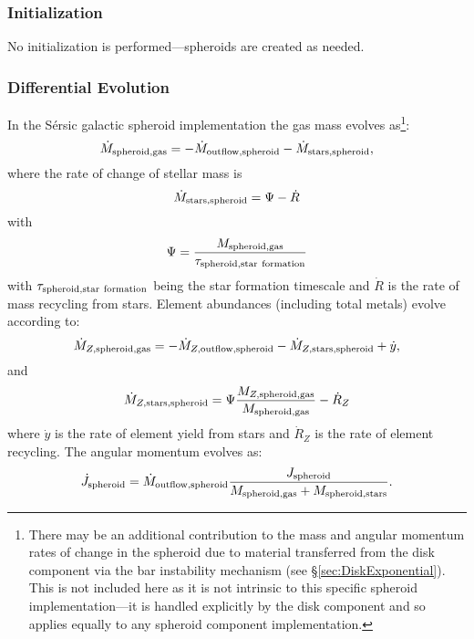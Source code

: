 \subsubsection{Initialization}

No initialization is performed---spheroids are created as needed.

\subsubsection{Differential Evolution}

In the S\'ersic galactic spheroid implementation the gas mass evolves as\footnote{There may be an additional contribution to the mass and angular momentum rates of change in the spheroid due to material transferred from the disk \gls{component} via the bar instability mechanism (see \S\protect\ref{sec:DiskExponential}). This is not included here as it is not intrinsic to this specific spheroid implementation---it is handled explicitly by the disk \gls{component} and so applies equally to any spheroid \gls{component} implementation.}:
\begin{equation}
 \dot{M}_{\rm spheroid, gas} = - \dot{M}_{\rm outflow, spheroid} - \dot{M}_{\rm stars, spheroid},
\end{equation}
where the rate of change of stellar mass is
\begin{equation}
 \dot{M}_{\rm stars, spheroid} = \Psi - \dot{R}
\end{equation}
with
\begin{equation}
 \Psi = {M_{\rm spheroid, gas} \over \tau_{\rm spheroid, star~formation}}
\end{equation}
with $\tau_{\rm spheroid, star~formation}$ being the star formation timescale and $\dot{R}$ is the rate of mass recycling from stars.
Element abundances (including total metals) evolve according to:
\begin{equation}
  \dot{M}_{Z, {\rm spheroid, gas}} = - \dot{M}_{Z, {\rm outflow, spheroid}} - \dot{M}_{Z, {\rm stars, spheroid}} + \dot{y},
\end{equation}
and
\begin{equation}
 \dot{M}_{Z, {\rm stars, spheroid}} = \Psi {M_{Z, {\rm spheroid, gas}} \over M_{\rm spheroid, gas}} - \dot{R}_Z
\end{equation}
where $\dot{y}$ is the rate of element yield from stars and $\dot{R}_Z$ is the rate of element recycling. The angular momentum evolves as:
\begin{equation}
 \dot{J}_{\rm spheroid} = \dot{M}_{\rm outflow, spheroid} {J_{\rm spheroid} \over M_{\rm spheroid, gas} + M_{\rm spheroid, stars}}.
\end{equation}

